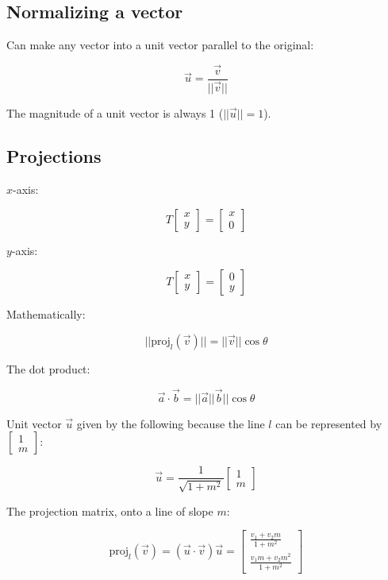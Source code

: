 \subsection{Normalizing a vector}

Can make any vector into a unit vector parallel to the original:

\[\boxed{\vec{u}=\frac{\vec{v}}{||\vec{v}||}}\]

The magnitude of a unit vector is always 1 ($||\vec{u}||=1$).

\subsection{Projections}

$x$-axis:

\[
      T \begin{bmatrix}x\\ y\end{bmatrix}=
      \begin{bmatrix}x\\ 0\end{bmatrix}
\]

$y$-axis:

\[
  T \begin{bmatrix}x\\ y\end{bmatrix}
  = \begin{bmatrix}0\\ y\end{bmatrix}
\]

Mathematically:

\[||\mathrm{proj}_l(\vec{v})||=||\vec{v}||\cos\theta\]

The dot product:

\[\boxed{\vec{a}\cdot \vec{b}=||\vec{a}||\vec{b}||\cos\theta}\]

Unit vector $\vec{u}$ given by the following because the line $l$ can be represented by $\begin{bmatrix}
    1\\m
\end{bmatrix}$:

\[\vec{u}=\frac{1}{\sqrt{1+m^2}}\begin{bmatrix}
    1\\m
\end{bmatrix}\]

The projection matrix, onto a line of slope $m$:

\[
    \mathrm{proj}_l(\vec{v})=(\vec{u}\cdot \vec{v})\vec{u} = 
    \begin{bmatrix}\frac{v_1+v_2m}{1+m^2}\\\frac{v_1m+v_2m^2}{1+m^2} \end{bmatrix}  
\]

